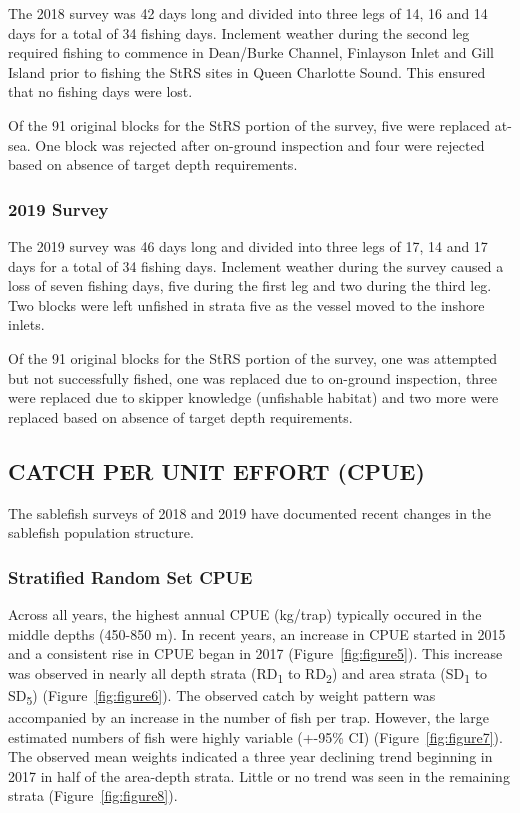 \documentclass[12pt]{article}\usepackage[]{graphicx}\usepackage[]{color}
\begin{document}
The 2018 survey was 42 days long and divided into three legs of 14, 16 and 14 days for a total of 34 fishing days. Inclement weather during the second leg required fishing to commence in Dean/Burke Channel, Finlayson Inlet and Gill Island prior to fishing the StRS sites in Queen Charlotte Sound. This ensured that no fishing days were lost.

Of the 91 original blocks for the StRS portion of the survey, five were replaced at-sea. One block was rejected after on-ground inspection and four were rejected based on absence of target depth requirements.

\hypertarget{survey-1}{%
\subsubsection{2019 Survey}\label{survey-1}}

The 2019 survey was 46 days long and divided into three legs of 17, 14 and 17 days for a total of 34 fishing days. Inclement weather during the survey caused a loss of seven fishing days, five during the first leg and two during the third leg. Two blocks were left unfished in strata five as the vessel moved to the inshore inlets.

Of the 91 original blocks for the StRS portion of the survey, one was attempted but not successfully fished, one was replaced due to on-ground inspection, three were replaced due to skipper knowledge (unfishable habitat) and two more were replaced based on absence of target depth requirements.

\hypertarget{catch-per-unit-effort-cpue}{%
\subsection{CATCH PER UNIT EFFORT (CPUE)}\label{catch-per-unit-effort-cpue}}

The sablefish surveys of 2018 and 2019 have documented recent changes in the sablefish population structure.

\hypertarget{stratified-random-set-cpue}{%
\subsubsection{Stratified Random Set CPUE}\label{stratified-random-set-cpue}}

Across all years, the highest annual CPUE (kg/trap) typically occured in the middle depths (450-850 m). In recent years, an increase in CPUE started in 2015 and a consistent rise in CPUE began in 2017 (Figure~\ref{fig:figure5}). This increase was observed in nearly all depth strata (RD\textsubscript{1} to RD\textsubscript{2}) and area strata (SD\textsubscript{1} to SD\textsubscript{5}) (Figure~\ref{fig:figure6}). The observed catch by weight pattern was accompanied by an increase in the number of fish per trap. However, the large estimated numbers of fish were highly variable (+-95\% CI) (Figure~\ref{fig:figure7}). The observed mean weights indicated a three year declining trend beginning in 2017 in half of the area-depth strata. Little or no trend was seen in the remaining strata (Figure~\ref{fig:figure8}).
\end{document}
